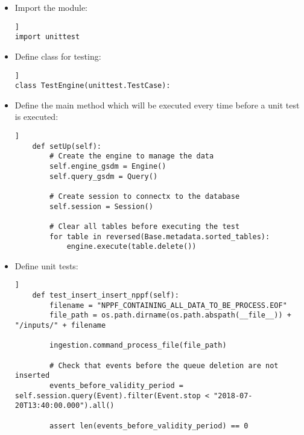 \begin{itemize}
\item Import the module:
\begin{lstlisting}[breaklines=true, style=python]]
import unittest
\end{lstlisting}
\item Define class for testing:
\begin{lstlisting}[breaklines=true, style=python]]
class TestEngine(unittest.TestCase):
\end{lstlisting}
\item Define the main method which will be executed every time before a unit test is executed:
\begin{lstlisting}[breaklines=true, style=python]]
    def setUp(self):
        # Create the engine to manage the data
        self.engine_gsdm = Engine()
        self.query_gsdm = Query()

        # Create session to connectx to the database
        self.session = Session()

        # Clear all tables before executing the test
        for table in reversed(Base.metadata.sorted_tables):
            engine.execute(table.delete())
\end{lstlisting}
\item Define unit tests:
\begin{lstlisting}[breaklines=true, style=python]]
    def test_insert_insert_nppf(self):
        filename = "NPPF_CONTAINING_ALL_DATA_TO_BE_PROCESS.EOF"
        file_path = os.path.dirname(os.path.abspath(__file__)) + "/inputs/" + filename

        ingestion.command_process_file(file_path)

        # Check that events before the queue deletion are not inserted
        events_before_validity_period = self.session.query(Event).filter(Event.stop < "2018-07-20T13:40:00.000").all()

        assert len(events_before_validity_period) == 0
\end{lstlisting}
\end{itemize}
